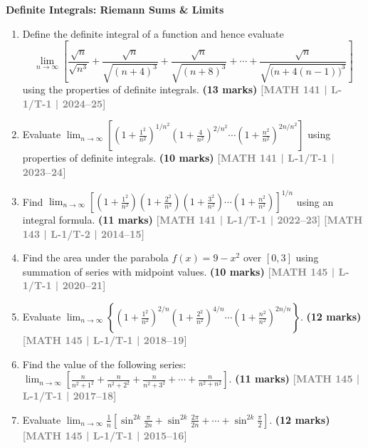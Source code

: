 \documentclass[12pt,a3paper]{article}
\newcommand{\yr}[1]{\hfill\textcolor{gray}{\small\textbf{[#1]}}}
\newcommand{\mk}[1]{\textcolor{orange!70!black}{\small\textbf{(#1 marks)}}}
\newcommand{\subtopic}[2]{%
  \vspace{10pt}
  \noindent\begin{tcolorbox}[colback=#1!8,colframe=#1,boxrule=0.6pt,arc=4pt,
    left=6pt,right=6pt,top=4pt,bottom=4pt]
    \small\bfseries\textcolor{#1}{#2}
  \end{tcolorbox}
  \vspace{2pt}
}
\begin{document}
\subtopic{cB}{Definite Integrals: Riemann Sums \& Limits}
\label{sub:s2-definite-riemann}

\begin{enumerate}

\item Define the definite integral of a function and hence evaluate
    \[
      \lim_{n\to\infty}\left[
        \frac{\sqrt{n}}{\sqrt{n^{3}}}
        +\frac{\sqrt{n}}{\sqrt{(n+4)^{3}}}
        +\frac{\sqrt{n}}{\sqrt{(n+8)^{3}}}
        +\cdots
        +\frac{\sqrt{n}}{\sqrt{\bigl(n+4(n-1)\bigr)^{3}}}
      \right]
    \]
    using the properties of definite integrals. 
\mk{13}  \yr{MATH 141 | L-1/T-1 | 2024--25}

\item Evaluate $\displaystyle\lim_{n\to\infty}\!\left[\left(1+\frac{1^{2}}{n^{2}}\right)^{1/n^{2}}\!\!\left(1+\frac{4}{n^{2}}\right)^{2/n^{2}}\!\!\cdots\left(1+\frac{n^{2}}{n^{2}}\right)^{2n/n^{2}}\right]$ using properties of definite integrals.
\mk{10} \yr{MATH 141 | L-1/T-1 | 2023--24}

\item Find $\displaystyle\lim_{n\to\infty}\!\left[\left(1+\frac{1^{2}}{n^{2}}\right)\!\left(1+\frac{2^{2}}{n^{2}}\right)\!\left(1+\frac{3^{2}}{n^{2}}\right)\cdots\left(1+\frac{n^{2}}{n^{2}}\right)\right]^{1/n}$ using an integral formula.
\mk{11} \yr{MATH 141 | L-1/T-1 | 2022--23} \yr{MATH 143 | L-1/T-2 | 2014--15}

\item Find the area under the parabola $f(x)=9-x^{2}$ over $[0,3]$ using summation of series with midpoint values.
\mk{10} \yr{MATH 145 | L-1/T-1 | 2020--21}

\item Evaluate $\displaystyle\lim_{n\to\infty}\left\{\left(1+\frac{1^{2}}{n^{2}}\right)^{2/n}\!\!\left(1+\frac{2^{2}}{n^{2}}\right)^{4/n}\!\!\cdots\left(1+\frac{n^{2}}{n^{2}}\right)^{2n/n}\right\}$.
\mk{12} \yr{MATH 145 | L-1/T-1 | 2018--19}

\item Find the value of the following series: $\displaystyle\lim_{n\to\infty}\left[\frac{n}{n^{2}+1^{2}}+\frac{n}{n^{2}+2^{2}}+\frac{n}{n^{2}+3^{2}}+\cdots+\frac{n}{n^{2}+n^{2}}\right]$.
\mk{11} \yr{MATH 145 | L-1/T-1 | 2017--18}

\item Evaluate $\displaystyle\lim_{n\to\infty}\frac{1}{n}\left[\sin^{2k}\!\frac{\pi}{2n}+\sin^{2k}\!\frac{2\pi}{2n}+\cdots+\sin^{2k}\!\frac{\pi}{2}\right]$.
\mk{12} \yr{MATH 145 | L-1/T-1 | 2015--16}

\end{enumerate}
\end{document}
